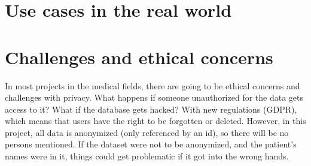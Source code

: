\section{Use cases in the real world}



\section{Challenges and ethical concerns}
In most projects in the medical fields, there are going to be ethical concerns and challenges with privacy. What happens if someone unauthorized for the data gets access to it? What if the database gets hacked? With new regulations (GDPR), which means that users have the right to be forgotten or deleted. However, in this project, all data is anonymized (only referenced by an id), so there will be no persons mentioned. If the dataset were not to be anonymized, and the patient's names were in it, things could get problematic if it got into the wrong hands. 
